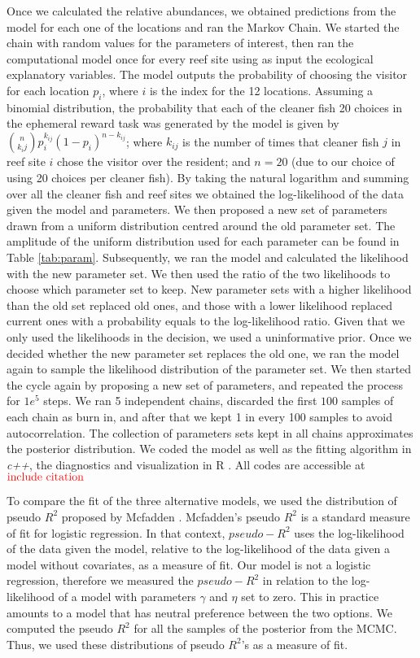 \documentclass[]{rsos}%
\begin{document}
Once we calculated the relative abundances, we obtained predictions from
the model for each one of the locations and ran the Markov Chain. We started the
chain with random values for the parameters of interest, then ran the
computational model once for every reef site using as input the ecological
explanatory variables. The model outputs the probability of choosing the visitor
for each location \(p_i\), where \(i\) is the index for the 12 locations. Assuming a
binomial distribution, the probability that each of the cleaner fish 20 choices
in the ephemeral reward task was generated by the model
is given by \(\binom{n}{k_ij}p^{k_{ij}}_i (1-p_i)^{n-k_{ij}}\);
where \(k_{ij}\) is the number of times that cleaner fish \(j\) in reef site \(i\)
chose the visitor over the resident; and \(n=20\) (due to our choice of using 20
choices per cleaner fish). By taking the natural logarithm and summing over all
the cleaner fish and reef sites we obtained the log-likelihood of the data
given the model and parameters. We then proposed a new set of parameters drawn
from a uniform distribution centred around the old parameter set. The amplitude
of the uniform distribution used for each parameter can be found in Table
\ref{tab:param}. Subsequently, we ran the model and calculated the likelihood
with the new parameter set. We then used the ratio of the two likelihoods to
choose which parameter set to keep. New parameter sets with a higher likelihood
than the old set replaced old ones, and those with a lower likelihood replaced
current ones with a probability equals to the log-likelihood ratio.
Given that we only used the likelihoods in the decision, we used a
uninformative prior. Once we decided whether the new parameter set replaces
the old one, we ran the model again to sample the likelihood
distribution of the parameter set. We then started
the cycle again by proposing a new set of parameters, and repeated
the process for \(1e^5\) steps. We ran 5 independent chains,
discarded the first \(100\) samples of each chain as burn in,
and after that we kept 1 in every 100 samples to avoid autocorrelation.
The collection of parameters sets kept in
all chains approximates the posterior distribution. We coded the model
as well as the fitting algorithm in \emph{c++}, the diagnostics and visualization
in R \citep{rcoreteam_Language_2021}. All codes are accessible at
\(\color{red}{\text{include citation}}\)

To compare the fit of the three alternative models, we used the
distribution of pseudo \(R^2\) proposed by Mcfadden \citep{mcfadden_Conditional_1974}.
Mcfadden's pseudo \(R^2\) is a standard measure of fit for logistic regression.
In that context, \(pseudo-R^2\) uses the log-likelihood of the data given
the model, relative to the log-likelihood of the data given a
model without covariates, as a measure of fit. Our
model is not a logistic regression, therefore we measured the \(pseudo-R^2\) in
relation to the log-likelihood of a model
with parameters \(\gamma\) and \(\eta\) set to zero. This in practice
amounts to a model that has neutral preference between the two options.
We computed the pseudo \(R^2\) for all the samples of the posterior from
the MCMC. Thus, we used these distributions of pseudo \(R^2\)'s as a measure of
fit.
\end{document}
